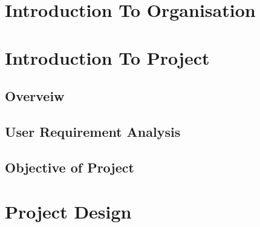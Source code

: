 \documentclass[12pt]{report}
\begin{document}

\begin{screen}
\ppttitle
\end{screen}
\footskip 0.7cm
\thispagestyle{empty} 
\pagetitle
\newpage
{}
\cfoot{\thepage}


\newpage




\newpage
\tableofcontents
\newpage
\listoffigures
\newpage

\cfoot{\thepage}

\newpage
\chapter{Introduction To Organisation}

\newpage
%
\chapter{Introduction To Project}

\section{Overveiw}



\section{User Requirement Analysis} 




\section{Objective of Project}

\chapter{Project Design}



\end{document}

